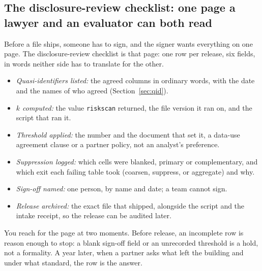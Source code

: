 \documentclass[
    a4paper,
    fontsize=10pt,
    twoside=true,
    numbers=noenddot,
]{kaobook}
\begin{document}
\subsection{The disclosure-review checklist: one page a lawyer and an evaluator can both read}\label{ch14-sc-checklist}
Before a file ships, someone has to sign, and the signer wants everything on one page. The disclosure-review checklist is that page: one row per release, six fields, in words neither side has to translate for the other.
\begin{itemize}
\item \emph{Quasi-identifiers listed:} the agreed columns in ordinary words, with the date and the names of who agreed (Section~\ref{sec:qid}).
\item \emph{$k$ computed:} the value \texttt{riskscan} returned, the file version it ran on, and the script that ran it.
\item \emph{Threshold applied:} the number and the document that set it, a data-use agreement clause or a partner policy, not an analyst's preference.
\item \emph{Suppression logged:} which cells were blanked, primary or complementary, and which exit each failing table took (coarsen, suppress, or aggregate) and why.
\item \emph{Sign-off named:} one person, by name and date; a team cannot sign.
\item \emph{Release archived:} the exact file that shipped, alongside the script and the intake receipt, so the release can be audited later.
\end{itemize}
You reach for the page at two moments. Before release, an incomplete row is reason enough to stop: a blank sign-off field or an unrecorded threshold is a hold, not a formality. A year later, when a partner asks what left the building and under what standard, the row is the answer.
\end{document}
